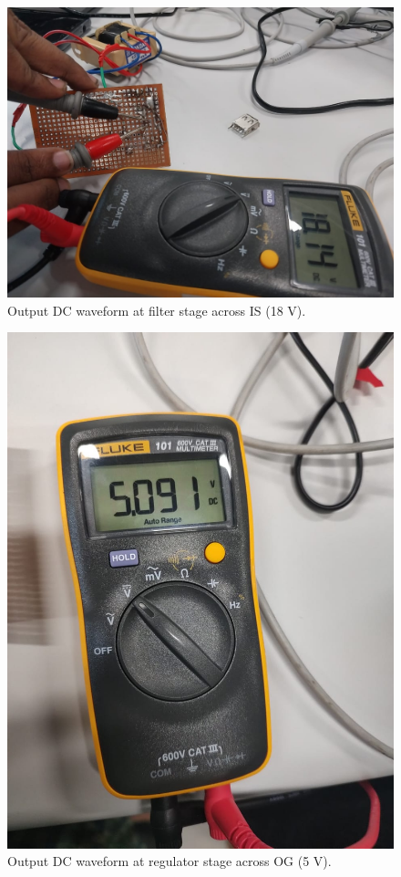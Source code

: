 \documentclass[journal,12pt,twocolumn]{IEEEtran}
\begin{document}
\begin{figure}[!ht]
    \includegraphics[width=\columnwidth]{figs/figure3.jpg}
    \caption{Output DC waveform at filter stage across IS (18 V).}
    \label{fig:filter}
\end{figure}

\begin{figure}[!ht]
    \includegraphics[width=\columnwidth]{figs/figure4.jpg}
    \caption{Output DC waveform at regulator stage across OG (5 V).}
    \label{fig:regulator_dc}
\end{figure}
\end{document}
